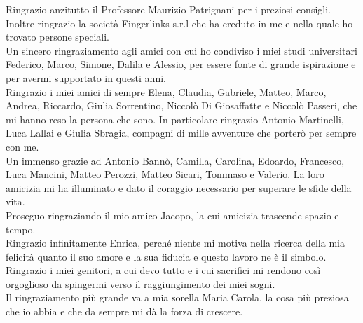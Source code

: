 Ringrazio anzitutto il Professore Maurizio Patrignani per i preziosi consigli.
Inoltre ringrazio la società Fingerlinks s.r.l che ha creduto in me e nella quale ho trovato persone speciali.\\
Un sincero ringraziamento agli amici con cui ho condiviso i miei studi universitari \\
Federico, Marco, Simone, Dalila e Alessio, per essere fonte di grande ispirazione e per avermi supportato in questi anni.\\
Ringrazio i miei amici di sempre Elena, Claudia, Gabriele, Matteo, Marco, Andrea, Riccardo, Giulia Sorrentino, Niccolò Di Giosaffatte e Niccolò Passeri, che mi hanno reso la persona che sono. In particolare ringrazio Antonio Martinelli, Luca Lallai e Giulia Sbragia, compagni di mille avventure che porterò per sempre con me.\\  
Un immenso grazie ad Antonio Bannò, Camilla, Carolina, Edoardo, Francesco, Luca Mancini, Matteo Perozzi, Matteo Sicari, Tommaso e Valerio. La loro amicizia mi ha illuminato e dato il coraggio necessario per superare le sfide della vita.\\
Proseguo ringraziando il mio amico Jacopo, la cui amicizia trascende spazio e tempo. \\
Ringrazio infinitamente Enrica, perché niente mi motiva nella ricerca della mia felicità quanto il suo amore e la sua fiducia e questo lavoro ne è il simbolo.\\
Ringrazio i miei genitori, a cui devo tutto e i cui sacrifici mi rendono così orgoglioso da spingermi verso il raggiungimento dei miei sogni.\\

Il ringraziamento più grande va a mia sorella Maria Carola, la cosa più preziosa che io abbia e che da sempre mi dà la forza di crescere.
